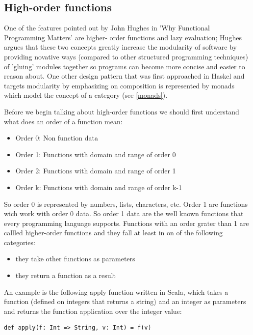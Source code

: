 \documentclass{article}
\begin{document}
\subsection {High-order functions}
One of the features pointed out by John Hughes \cite{DBLP:journals/cj/Hughes89} in 'Why Functional Programming Matters' are higher- order functions and lazy evaluation; Hughes argues that these two concepts greatly increase the modularity of software by providing novative ways (compared to other structured programming techniques) of 'gluing' modules together so programs can become more concise and easier to reason about. One other design pattern that was first approached in Haskel and targets modularity by emphasizing on composition is represented by monads which model the concept of a category (see \ref{monads}). \par 
Before we begin talking about high-order functions we should first understand what does an order of a function mean:

\begin{itemize}
\item Order 0: Non function data
\item Order 1: Functions with domain and range of order 0
\item Order 2: Functions with domain and range of order 1
\item Order k: Functions with domain and range of order k-1
\end{itemize}

So order 0 is represented by numbers, lists, characters, etc. Order 1 are functions wich work with order 0 data. So order 1 data are the well known functions that every programming language supports. 
Functions with an order grater than 1 are callled higher-order functions and they fall at least in on of the following categories:

\begin{itemize}
\item they take other functions as parameters
\item they return a function as a result
\end{itemize}

An example is the following apply function written in Scala, which takes a function (defined on integers that returns a string) and an integer as parameters and returns the function application over the integer value: \par

\begin{lstlisting} 
def apply(f: Int => String, v: Int) = f(v)
\end{lstlisting} 
\end{document}
